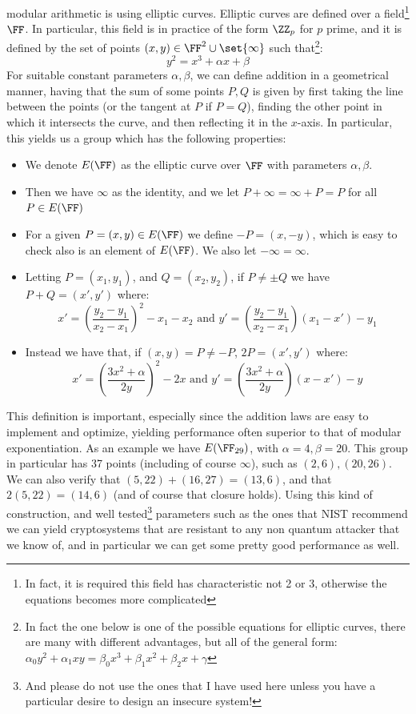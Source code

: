 \documentclass{article}
\begin{document}
modular arithmetic is using elliptic curves. Elliptic curves are defined over a field\footnote{In fact, it is required this
    field has characteristic not 2 or 3, otherwise the equations becomes more complicated} $\FF$. In particular,
this field is in practice of the form $\ZZ_p$ for $p$ prime, and it is defined by the set of points $(x, y) \in \FF^2 \cup \set{ \infty }$ such that\footnote{In fact the one below is
    one of the possible equations for elliptic curves, there are many with different advantages, but all of the general form: $\alpha_0 y^2 + \alpha_1 xy = \beta_0 x^3 + \beta_1 x^2 + \beta_2 x + \gamma$}:
\[ y^2 = x^3 + \alpha x + \beta \]
For suitable constant parameters $\alpha, \beta$, we can define addition in a geometrical manner, having that the sum of some
points $P, Q$ is given by first taking the line between the points (or the tangent at $P$ if $P = Q$), finding the other point in which
it intersects the curve, and then reflecting it in the $x$-axis. In particular, this yields us a group which has the following properties:
\begin{itemize}
    \item We denote $E(\FF)$ as the elliptic curve over $\FF$ with parameters $\alpha, \beta$.
    \item Then we have $\infty$ as the identity, and we let $P + \infty = \infty + P = P$ for all $P \in E(\FF)$
    \item For a given $P = (x, y) \in E(\FF)$ we define $-P = (x, -y)$, which is easy to check also is an element of $E(\FF)$. We also let $-\infty = \infty$.
    \item Letting $P = (x_1, y_1)$, and $Q = (x_2, y_2)$, if $P \neq \pm Q$ we have $P + Q = (x', y')$ where:
          \[ x' = \left(\frac{y_2 - y_1}{x_2 - x_1}\right)^2 - x_1 - x_2 \text{ and } y' = \left(\frac{y_2 - y_1}{x_2 - x_1}\right)(x_1 - x') - y_1  \]
    \item Instead we have that, if $(x, y) = P \neq -P$, $2P = (x', y')$ where:
          \[ x' = \left(\frac{3x^2 + \alpha}{2y}\right)^2 - 2x \text{ and } y' = \left(\frac{3x^2 + \alpha}{2y}\right)(x - x') - y  \]
\end{itemize}
This definition is important, especially since the addition laws are easy to implement and optimize, yielding performance
often superior to that of modular exponentiation. As an example we have $E(\FF_{29})$, with $\alpha=4, \beta=20$.
This group in particular has 37 points (including of course $\infty$), such as $(2,6), (20, 26)$. We can also
verify that $(5, 22) + (16, 27) = (13, 6)$, and that $2(5, 22) = (14, 6)$ (and of course that closure holds).
Using this kind of construction, and well tested\footnote{And please do not use the ones that I have used here unless you have a particular desire to design an insecure system!}
parameters such as the ones that NIST recommend \cite{barkerRecommendationPairWiseKeyEstablishment2018}
we can yield cryptosystems that are resistant to any non quantum attacker that we know of, and in particular we can get some pretty good performance as well.
\end{document}
